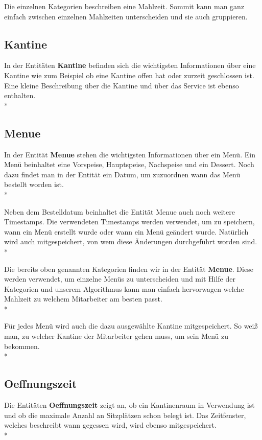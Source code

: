 Die einzelnen Kategorien beschreiben eine Mahlzeit. Sommit kann man ganz einfach zwischen einzelnen Mahlzeiten unterscheiden und sie auch gruppieren.


\subsection{Kantine}

In der Entitäten \textbf{Kantine} befinden sich die wichtigsten Informationen über eine Kantine wie zum Beispiel ob eine Kantine offen hat oder zurzeit geschlossen ist. 
Eine kleine Beschreibung über die Kantine und über das Service ist ebenso enthalten. \\*

\subsection{Menue}

In der Entität \textbf{Menue} stehen die wichtigsten Informationen über ein Menü. Ein Menü beinhaltet eine Vorspeise, Hauptspeise, Nachspeise und ein Dessert. 
Noch dazu findet man in der Entität ein Datum, um zuzuordnen wann das Menü bestellt worden ist. \\*

Neben dem Bestelldatum beinhaltet die Entität Menue auch noch weitere Timestamps.
Die verwendeten Timestamps werden verwendet, um zu speichern, wann ein Menü erstellt wurde oder wann ein Menü geändert wurde. 
Natürlich wird auch mitgespeichert, von wem diese Änderungen durchgeführt worden sind. \\*


Die bereits oben genannten Kategorien finden wir in der Entität \textbf{Menue}. 
Diese werden verwendet, um einzelne Menüs zu unterscheiden und mit Hilfe der Kategorien und unserem Algorithmus kann man einfach hervorwagen welche Mahlzeit zu welchem Mitarbeiter am besten passt. \\*

Für jedes Menü wird auch die dazu ausgewählte Kantine mitgespeichert. So weiß man, zu welcher Kantine der Mitarbeiter gehen muss, um sein Menü zu bekommen. \\*



\subsection{Oeffnungszeit}

Die Entitäten \textbf{Oeffnungszeit} zeigt an, ob ein Kantinenraum in Verwendung ist und ob die maximale Anzahl an Sitzplätzen schon belegt ist. 
Das Zeitfenster, welches beschreibt wann gegessen wird, wird ebenso mitgespeichert. \\*

